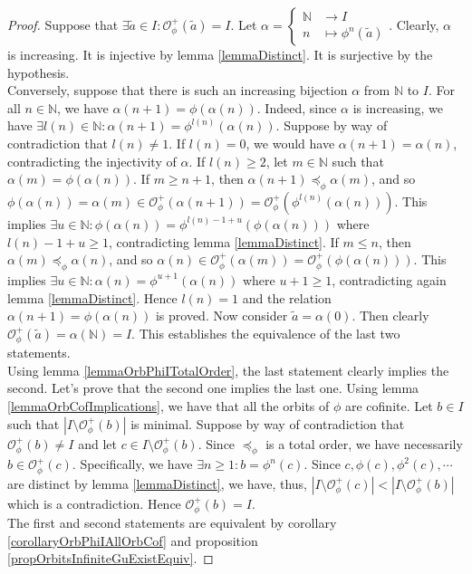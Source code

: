 \documentclass[a4paper,11pt]{article}
\theoremstyle{plain}
\theoremstyle{definition}
\theoremstyle{remark}
\begin{document}
\begin{proof}
Suppose that $\exists \widetilde{a} \in I : \mathcal{O}^{+}_\phi(\widetilde{a}) = I$. Let $\alpha = \begin{cases} \mathbb{N} &\to I \\ n &\mapsto \phi^n(\widetilde{a}) \end{cases}$. Clearly, $\alpha$ is increasing. It is injective by lemma \ref{lemmaDistinct}. It is surjective by the hypothesis. \\
Conversely, suppose that there is such an increasing bijection $\alpha$ from $\mathbb{N}$ to $I$. For all $n \in \mathbb{N}$, we have $\alpha(n+1) = \phi(\alpha(n))$. Indeed, since $\alpha$ is increasing, we have $\exists l(n) \in \mathbb{N} : \alpha(n+1) = \phi^{l(n)}(\alpha(n))$. Suppose by way of contradiction that $l(n) \neq 1$. If $l(n)=0$, we would have $\alpha(n+1)=\alpha(n)$, contradicting the injectivity of $\alpha$. If $l(n) \geq 2$, let $m \in \mathbb{N}$ such that $\alpha(m)=\phi(\alpha(n))$. If $m \geq n+1$, then $\alpha(n+1) \preceq_\phi \alpha(m)$, and so $\phi(\alpha(n)) = \alpha(m) \in \mathcal{O}^{+}_\phi(\alpha(n+1)) = \mathcal{O}^{+}_\phi(\phi^{l(n)}(\alpha(n)))$. This implies $\exists u \in \mathbb{N} : \phi(\alpha(n))  = \phi^{l(n)-1+u}(\phi(\alpha(n)))$ where $l(n)-1+u \geq 1$, contradicting lemma \ref{lemmaDistinct}. If $m \leq n$, then $\alpha(m) \preceq_\phi \alpha(n)$, and so $\alpha(n) \in \mathcal{O}^{+}_\phi(\alpha(m)) = \mathcal{O}^{+}_\phi(\phi(\alpha(n)))$. This implies $\exists u \in \mathbb{N} : \alpha(n) = \phi^{u+1}(\alpha(n))$ where $u+1 \geq 1$, contradicting again lemma \ref{lemmaDistinct}. Hence $l(n)=1$ and the relation $\alpha(n+1)=\phi(\alpha(n))$ is proved. Now consider $\widetilde{a} = \alpha(0)$. Then clearly $\mathcal{O}^{+}_\phi(\widetilde{a}) = \alpha(\mathbb{N}) = I$.
This establishes the equivalence of the last two statements. \\
Using lemma \ref{lemmaOrbPhiITotalOrder}, the last statement clearly implies the second. Let's prove that the second one implies the last one. Using lemma \ref{lemmaOrbCofImplications}, we have that all the orbits of $\phi$ are cofinite. Let $b \in I$ such that $|I \setminus \mathcal{O}^{+}_\phi(b)|$ is minimal. Suppose by way of contradiction that $\mathcal{O}^{+}_\phi(b) \neq I$ and let $c \in I \setminus \mathcal{O}^{+}_\phi(b)$. Since $\preceq_\phi$ is a total order, we have necessarily $b \in \mathcal{O}^{+}_\phi(c)$. Specifically, we have $\exists n \geq 1 : b = \phi^n(c)$. Since $c,\phi(c),\phi^2(c),\cdots$ are distinct by lemma \ref{lemmaDistinct}, we have, thus, $|I \setminus \mathcal{O}^{+}_\phi(c)| < |I \setminus \mathcal{O}^{+}_\phi(b)|$ which is a contradiction. Hence $\mathcal{O}^{+}_\phi(b) = I$. \\
The first and second statements are equivalent by corollary \ref{corollaryOrbPhiIAllOrbCof} and proposition \ref{propOrbitsInfiniteGuExistEquiv}.
\end{proof}
\end{document}
